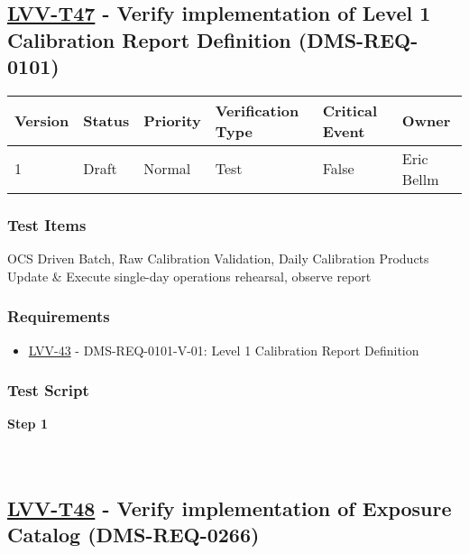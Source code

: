 \hypertarget{lvv-t47---verify-implementation-of-level-1-calibration-report-definition-dms-req-0101}{%
\subsection{\texorpdfstring{\href{https://jira.lsstcorp.org/secure/Tests.jspa\#/testCase/LVV-T47}{LVV-T47}
- Verify implementation of Level 1 Calibration Report Definition
(DMS-REQ-0101)}{LVV-T47 - Verify implementation of Level 1 Calibration Report Definition (DMS-REQ-0101)}}\label{lvv-t47---verify-implementation-of-level-1-calibration-report-definition-dms-req-0101}}

\begin{longtable}[]{@{}llllll@{}}
\toprule
Version & Status & Priority & Verification Type & Critical Event &
Owner\tabularnewline
\midrule
\endhead
1 & Draft & Normal & Test & False & Eric Bellm\tabularnewline
\bottomrule
\end{longtable}

\hypertarget{test-items-23}{%
\subsubsection{Test Items}\label{test-items-23}}

OCS Driven Batch, Raw Calibration Validation, Daily Calibration Products
Update \& Execute single-day operations rehearsal, observe report

\hypertarget{requirements-24}{%
\subsubsection{Requirements}\label{requirements-24}}

\begin{itemize}
\tightlist
\item
  \href{https://jira.lsstcorp.org/browse/LVV-43}{LVV-43} -
  DMS-REQ-0101-V-01: Level 1 Calibration Report Definition
\end{itemize}

\hypertarget{test-script-24}{%
\subsubsection{Test Script}\label{test-script-24}}

\textbf{Step 1}\\
~\\
~\\

\hypertarget{lvv-t48---verify-implementation-of-exposure-catalog-dms-req-0266}{%
\subsection{\texorpdfstring{\href{https://jira.lsstcorp.org/secure/Tests.jspa\#/testCase/LVV-T48}{LVV-T48}
- Verify implementation of Exposure Catalog
(DMS-REQ-0266)}{LVV-T48 - Verify implementation of Exposure Catalog (DMS-REQ-0266)}}\label{lvv-t48---verify-implementation-of-exposure-catalog-dms-req-0266}}


